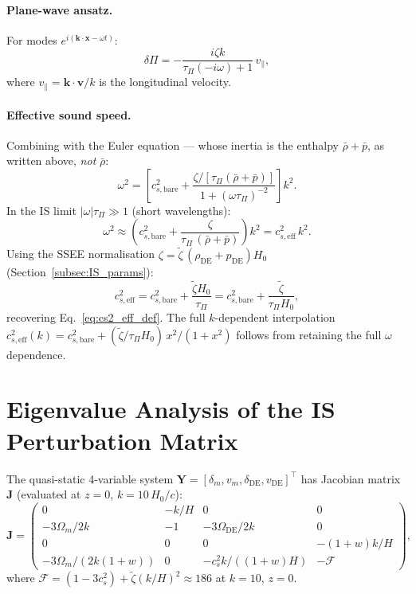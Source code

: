 \documentclass[12pt,a4paper]{article}
\newcommand{\OmDE}{\Omega_{\mathrm{DE}}}
\newcommand{\tauPi}{\tau_\Pi}
\newcommand{\ztilde}{\tilde{\zeta}}
\begin{document}
\paragraph{Plane-wave ansatz.}
For modes $e^{i(\mathbf{k}\cdot\mathbf{x} - \omega t)}$:
\begin{equation}
  \delta\Pi = -\frac{i\zeta k}{\tauPi(-i\omega)+1}\,v_\parallel,
\end{equation}
where $v_\parallel = \mathbf{k}\cdot\mathbf{v}/k$ is the longitudinal velocity.

\paragraph{Effective sound speed.}
Combining with the Euler equation --- whose inertia is the enthalpy
$\bar\rho+\bar p$, as written above, \emph{not} $\bar\rho$:
\begin{equation}
  \omega^2 = \left[c^2_{s,\mathrm{bare}}
  + \frac{\zeta/[\tauPi(\bar\rho+\bar p)]}{1+(\omega\tauPi)^{-2}}\right]k^2.
\end{equation}
In the IS limit $|\omega|\tauPi \gg 1$ (short wavelengths):
\begin{equation}
  \omega^2 \approx \left(c^2_{s,\mathrm{bare}}
  + \frac{\zeta}{\tauPi\,(\bar\rho+\bar p)}\right)k^2
  = c^2_{s,\mathrm{eff}}\,k^2.
\end{equation}
Using the SSEE normalisation
$\zeta = \ztilde\,(\rho_{\mathrm{DE}}+p_{\mathrm{DE}})H_0$
(Section~\ref{subsec:IS_params}):
\begin{equation}
  c^2_{s,\mathrm{eff}} = c^2_{s,\mathrm{bare}} + \frac{\ztilde H_0}{\tauPi}
  = c^2_{s,\mathrm{bare}} + \frac{\ztilde}{\tauPi H_0},
\end{equation}
recovering Eq.~\eqref{eq:cs2_eff_def}.
The full $k$-dependent interpolation
$c^2_{s,\mathrm{eff}}(k) = c^2_{s,\mathrm{bare}} + (\ztilde/\tauPi H_0)\,x^2/(1+x^2)$
follows from retaining the full $\omega$ dependence.

\section{Eigenvalue Analysis of the IS Perturbation Matrix}
\label{app:eigenvalues}

The quasi-static 4-variable system $\mathbf{Y} = [\delta_m, v_m, \delta_{\mathrm{DE}}, v_{\mathrm{DE}}]^\top$
has Jacobian matrix $\mathbf{J}$ (evaluated at $z=0$, $k=10\,H_0/c$):
\begin{equation}
  \mathbf{J} = \begin{pmatrix}
    0 & -k/H & 0 & 0 \\
    -3\Omega_m/2k & -1 & -3\OmDE/2k & 0 \\
    0 & 0 & 0 & -(1+w)k/H \\
    -3\Omega_m/(2k(1+w)) & 0 & -c^2_s k/((1+w)H) & -\mathcal{F}
  \end{pmatrix},
\end{equation}
where $\mathcal{F} = (1-3c^2_s) + \ztilde(k/H)^2 \approx 186$ at $k=10$, $z=0$.
\end{document}
